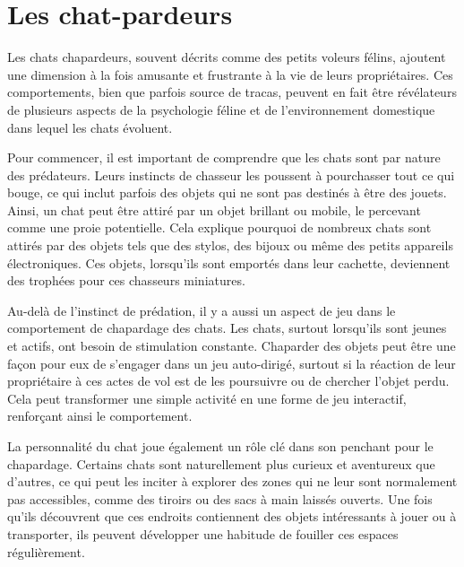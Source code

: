 \documentclass{report}
\begin{document}
\newpage %

\section{Les chat-pardeurs}

Les chats chapardeurs, souvent décrits comme des petits voleurs félins, ajoutent une dimension à la fois amusante et frustrante à la vie de leurs propriétaires. Ces comportements, bien que parfois source de tracas, peuvent en fait être révélateurs de plusieurs aspects de la psychologie féline et de l'environnement domestique dans lequel les chats évoluent.
\par %
\smallskip %
\noindent %
Pour commencer, il est important de comprendre que les chats sont par nature des prédateurs. Leurs instincts de chasseur les poussent à pourchasser tout ce qui bouge, ce qui inclut parfois des objets qui ne sont pas destinés à être des jouets. Ainsi, un chat peut être attiré par un objet brillant ou mobile, le percevant comme une proie potentielle. Cela explique pourquoi de nombreux chats sont attirés par des objets tels que des stylos, des bijoux ou même des petits appareils électroniques. Ces objets, lorsqu'ils sont emportés dans leur cachette, deviennent des trophées pour ces chasseurs miniatures.
\par %
\smallskip %
\noindent %
Au-delà de l'instinct de prédation, il y a aussi un aspect de jeu dans le comportement de chapardage des chats. Les chats, surtout lorsqu'ils sont jeunes et actifs, ont besoin de stimulation constante. Chaparder des objets peut être une façon pour eux de s'engager dans un jeu auto-dirigé, surtout si la réaction de leur propriétaire à ces actes de vol est de les poursuivre ou de chercher l'objet perdu. Cela peut transformer une simple activité en une forme de jeu interactif, renforçant ainsi le comportement.


La personnalité du chat joue également un rôle clé dans son penchant pour le chapardage. Certains chats sont naturellement plus curieux et aventureux que d'autres, ce qui peut les inciter à explorer des zones qui ne leur sont normalement pas accessibles, comme des tiroirs ou des sacs à main laissés ouverts. Une fois qu'ils découvrent que ces endroits contiennent des objets intéressants à jouer ou à transporter, ils peuvent développer une habitude de fouiller ces espaces régulièrement.
\end{document}
